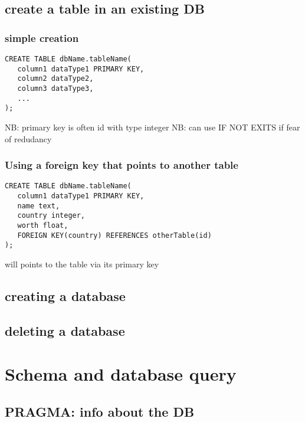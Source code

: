 	\subsection{create a table in an existing DB}

		\subsubsection{simple creation}

\begin{lstlisting}
CREATE TABLE dbName.tableName(
   column1 dataType1 PRIMARY KEY,
   column2 dataType2,
   column3 dataType3,
   ...
);
\end{lstlisting}

			NB: primary key is often id with type integer
			NB: can use IF NOT EXITS if fear of redudancy

		\subsubsection{Using a foreign key that points to another table}

\begin{lstlisting}
CREATE TABLE dbName.tableName(
   column1 dataType1 PRIMARY KEY,
   name text,
   country integer,
   worth float,
   FOREIGN KEY(country) REFERENCES otherTable(id)
);
\end{lstlisting}

		will points to the table  via its primary key 


	\subsection{creating a database}
		

	\subsection{deleting a database}




\section{Schema and database query}

	\subsection{PRAGMA: info about the DB}
		
